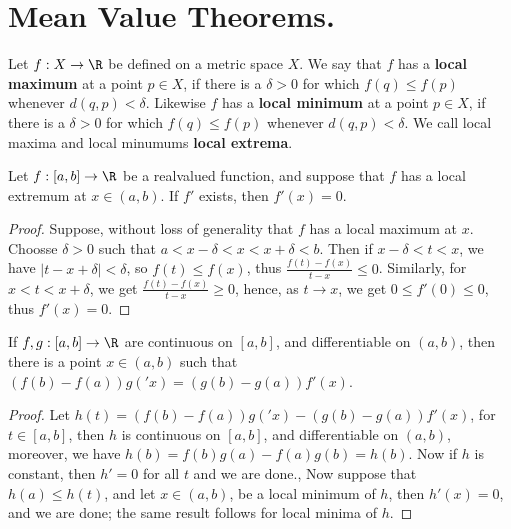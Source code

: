 
\section{Mean Value Theorems.}

\begin{definition}
    Let $f:X \rightarrow \R$ be defined on a metric space $X$. We say that  $f$ has a
    \textbf{local maximum} at a point  $p \in X$, if  there is a $\delta>0$ for which  $f(q) \leq f(p)$
    whenever  $d(q,p)<\delta$. Likewise $f$ has a \textbf{local minimum} at a point  $p \in X$,
    if  there is a $\delta>0$ for which  $f(q) \leq f(p)$ whenever  $d(q,p)<\delta$. We call
    local maxima and local minumums \textbf{local extrema}.
\end{definition}

\begin{theorem}\label{6.2.1}
    Let $f:[a,b] \rightarrow \R$ be a realvalued function, and suppose that  $f$ has a local
    extremum at  $x \in (a,b)$. If $f'$ exists, then  $f'(x)=0$.
\end{theorem}
\begin{proof}
    Suppose, without loss of generality that $f$ has a local maximum at  $x$. Choosse  $\delta>0$
    such that $a<x-\delta<x<x+\delta<b$. Then if  $x-\delta<t<x$, we have  $|t-x+\delta|<\delta$, so  $f(t) \leq f(x)$,
    thus  $\frac{f(t)-f(x)}{t-x} \leq 0$. Similarly, for $x<t<x+\delta$, we get $\frac{f(t)-f(x)}{t-x} \geq 0$,
    hence, as $t \rightarrow x$, we get  $0 \leq f'(0) \leq 0$, thus  $f'(x)=0$.
\end{proof}

\begin{theorem}\label{6.2.2}
    If $f,g:[a,b] \rightarrow \R$ are continuous on  $[a,b]$, and differentiable on  $(a,b)$, then
    there is a point  $x \in (a,b)$ such that $(f(b)-f(a))g('x)=(g(b)-g(a))f'(x)$.
\end{theorem}
\begin{proof}
    Let $h(t)=(f(b)-f(a))g('x)-(g(b)-g(a))f'(x)$, for $t \in [a,b]$, then $h$ is continuous on
    $[a,b]$, and differentiable on  $(a,b)$, moreover, we have  $h(b)=f(b)g(a)-f(a)g(b)=h(b)$. Now
    if  $h$ is constant, then $h'=0$ for all  $t$ and we are done., Now suppose that  $h(a) \leq h(t)$,
    and let  $x \in (a,b)$, be a local minimum of $h$, then  $h'(x)=0$, and we are done; the same
    result follows for local minima of  $h$.
\end{proof}

